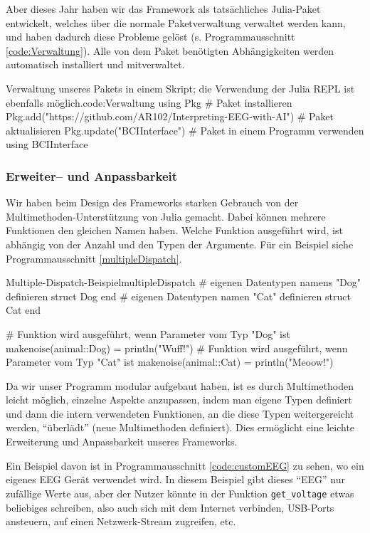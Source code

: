 \documentclass[10pt]{article}
\newcommand{\coderef}[1]{Programmausschnitt \ref{#1}}
\begin{document}
Aber dieses Jahr haben wir das Framework als tatsächliches Julia-Paket entwickelt, welches über die normale Paketverwaltung verwaltet werden kann, und haben dadurch diese Probleme gelöst (s. \coderef{code:Verwaltung}).
Alle von dem Paket benötigten Abhängigkeiten werden automatisch installiert und mitverwaltet.

\begin{code}[0.75]{Verwaltung unseres Pakets in einem Skript; die Verwendung der Julia REPL ist ebenfalls möglich.}{code:Verwaltung}
    using Pkg
    # Paket installieren
    Pkg.add("https://github.com/AR102/Interpreting-EEG-with-AI")
    # Paket aktualisieren
    Pkg.update("BCIInterface")
    # Paket in einem Programm verwenden
    using BCIInterface
\end{code}

\subsubsection{Erweiter-- und Anpassbarkeit}

Wir haben beim Design des Frameworks starken Gebrauch von der Multimethoden-Unterstützung von Julia gemacht.
Dabei können mehrere Funktionen den gleichen Namen haben. Welche Funktion ausgeführt wird, ist abhängig von der Anzahl und den Typen der Argumente. Für ein Beispiel siehe \coderef{multipleDispatch}.

\begin{code}{Multiple-Dispatch-Beispiel}{multipleDispatch}
# eigenen Datentypen namens "Dog" definieren
struct Dog end
# eigenen Datentypen namen "Cat" definieren
struct Cat end

# Funktion wird ausgeführt, wenn Parameter vom Typ "Dog" ist
makenoise(animal::Dog) = println("Wuff!")
# Funktion wird ausgeführt, wenn Parameter vom Typ "Cat" ist
makenoise(animal::Cat) = println("Meoow!")
\end{code}

Da wir unser Programm modular aufgebaut haben, ist es durch Multimethoden leicht möglich, einzelne Aspekte anzupassen, indem man eigene Typen definiert und dann die intern verwendeten Funktionen, an die diese Typen weitergereicht werden, \enquote{überlädt} (neue Multimethoden definiert). Dies ermöglicht eine leichte Erweiterung und Anpassbarkeit unseres Frameworks.

Ein Beispiel davon ist in \coderef{code:customEEG} zu sehen, wo ein eigenes EEG Gerät verwendet wird. In diesem Beispiel gibt dieses \enquote{EEG} nur zufällige Werte aus, aber der Nutzer könnte in der Funktion \texttt{get_voltage} etwas beliebiges schreiben, also auch sich mit dem Internet verbinden, USB-Ports ansteuern, auf einen Netzwerk-Stream zugreifen, etc. 
\end{document}
